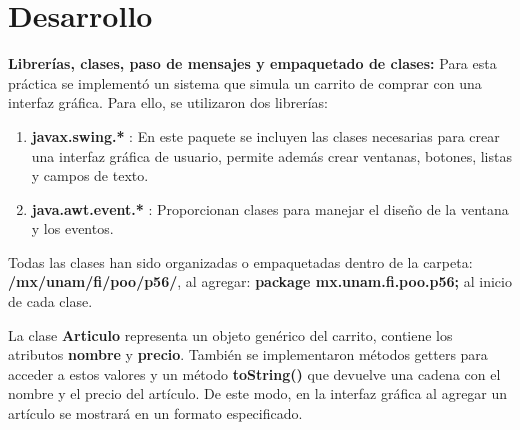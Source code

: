 \documentclass[letterpaper,12pt]{article}
\begin{document}
\section{Desarrollo}
\textbf{Librerías, clases, paso de mensajes y empaquetado de clases:}
Para esta práctica se implementó un sistema que simula un carrito de comprar con una interfaz gráfica. Para ello, se utilizaron dos librerías:
\begin{enumerate}
    \item \textbf{javax.swing.*} : En este paquete se incluyen las clases necesarias para crear una interfaz gráfica de usuario, permite además crear ventanas, botones, listas y campos de texto.
    \item \textbf{java.awt.event.*} : Proporcionan clases para manejar el diseño de la ventana y los eventos.
\end{enumerate}

Todas las clases han sido organizadas o empaquetadas dentro de la carpeta: \textbf{/mx/unam/fi/poo/p56/}, al agregar: \textbf{package mx.unam.fi.poo.p56;} al inicio de cada clase. 

La clase \textbf{Articulo} representa un objeto genérico del carrito, contiene los atributos \textbf{nombre} y \textbf{precio}. También se implementaron métodos getters para acceder a estos valores y un método \textbf{toString()} que devuelve una cadena con el nombre y el precio del artículo. De este modo, en la interfaz gráfica al agregar un artículo se mostrará en un formato especificado.
\end{document}
